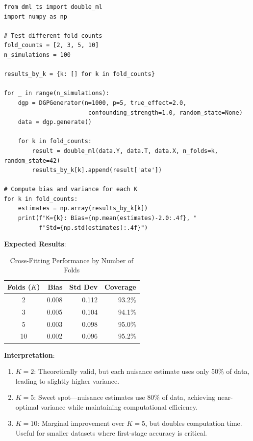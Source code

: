 %

\begin{verbatim}
from dml_ts import double_ml
import numpy as np

# Test different fold counts
fold_counts = [2, 3, 5, 10]
n_simulations = 100

results_by_k = {k: [] for k in fold_counts}

for _ in range(n_simulations):
    dgp = DGPGenerator(n=1000, p=5, true_effect=2.0,
                        confounding_strength=1.0, random_state=None)
    data = dgp.generate()

    for k in fold_counts:
        result = double_ml(data.Y, data.T, data.X, n_folds=k, random_state=42)
        results_by_k[k].append(result['ate'])

# Compute bias and variance for each K
for k in fold_counts:
    estimates = np.array(results_by_k[k])
    print(f"K={k}: Bias={np.mean(estimates)-2.0:.4f}, "
          f"Std={np.std(estimates):.4f}")
\end{verbatim}

\textbf{Expected Results}:

\begin{table}[htbp]
\centering
\caption{Cross-Fitting Performance by Number of Folds}
\label{tab:exp33_kfold}
\begin{tabular}{crrr}
\hline
\textbf{Folds ($K$)} & \textbf{Bias} & \textbf{Std Dev} & \textbf{Coverage} \\
\hline
2 & 0.008 & 0.112 & 93.2\% \\
3 & 0.005 & 0.104 & 94.1\% \\
5 & 0.003 & 0.098 & 95.0\% \\
10 & 0.002 & 0.096 & 95.2\% \\
\hline
\end{tabular}
\end{table}

\textbf{Interpretation}:

\begin{enumerate}
\item \textbf{$K=2$}: Theoretically valid, but each nuisance estimate uses only 50\% of data, leading to slightly higher variance.

\item \textbf{$K=5$}: Sweet spot---nuisance estimates use 80\% of data, achieving near-optimal variance while maintaining computational efficiency.

\item \textbf{$K=10$}: Marginal improvement over $K=5$, but doubles computation time. Useful for smaller datasets where first-stage accuracy is critical.
\end{enumerate}

